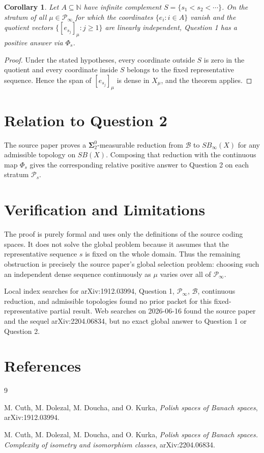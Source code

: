 \documentclass[11pt]{article}
\newtheorem{corollary}[theorem]{Corollary}
\newcommand{\PP}{\mathcal P}
\newcommand{\BB}{\mathcal B}
\newcommand{\Nat}{\mathbb N}
\begin{document}
\begin{corollary}
Let \(A\subseteq\Nat\) have infinite complement \(S=\{s_1<s_2<\cdots\}\). On
the stratum of all \(\mu\in\PP_\infty\) for which the coordinates
\(\{e_i:i\in A\}\) vanish and the quotient vectors
\(\{[e_{s_j}]_\mu:j\ge1\}\) are linearly independent, Question 1 has a
positive answer via \(\Phi_s\).
\end{corollary}

\begin{proof}
Under the stated hypotheses, every coordinate outside \(S\) is zero in the
quotient and every coordinate inside \(S\) belongs to the fixed representative
sequence. Hence the span of \([e_{s_j}]_\mu\) is dense in \(X_\mu\), and the
theorem applies.
\end{proof}

\section*{Relation to Question 2}

The source paper proves a \(\boldsymbol{\Sigma}^0_2\)-measurable reduction
from \(\BB\) to \(SB_\infty(X)\) for any admissible topology on \(SB(X)\).
Composing that reduction with the continuous map \(\Phi_s\) gives the
corresponding relative positive answer to Question 2 on each stratum
\(\PP_s\).

\section*{Verification and Limitations}

The proof is purely formal and uses only the definitions of the source coding
spaces. It does not solve the global problem because it assumes that the
representative sequence \(s\) is fixed on the whole domain. Thus the remaining
obstruction is precisely the source paper's global selection problem: choosing
such an independent dense sequence continuously as \(\mu\) varies over all of
\(\PP_\infty\).

Local index searches for arXiv:1912.03994, Question 1, \(\PP_\infty\),
\(\BB\), continuous reduction, and admissible topologies found no prior packet
for this fixed-representative partial result. Web searches on 2026-06-16 found
the source paper and the sequel arXiv:2204.06834, but no exact global answer
to Question 1 or Question 2.

\section*{References}

\begin{thebibliography}{9}

M. Cuth, M. Dolezal, M. Doucha, and O. Kurka,
\emph{Polish spaces of Banach spaces},
arXiv:1912.03994.

M. Cuth, M. Dolezal, M. Doucha, and O. Kurka,
\emph{Polish spaces of Banach spaces. Complexity of isometry and isomorphism classes},
arXiv:2204.06834.

\end{thebibliography}
\end{document}
